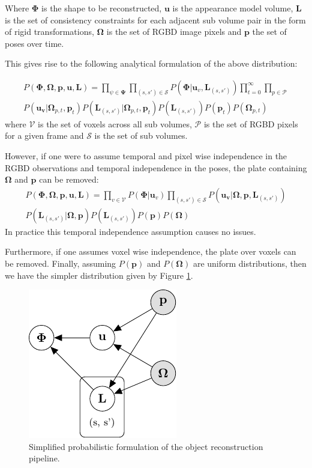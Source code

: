 Where $\bm{\Phi}$ is the shape to be reconstructed, $\bm{u}$ is the appearance model volume, $\bm{L}$ is the 
set of consistency constraints for each adjacent sub volume pair in the form of rigid transformations, $\bm{\Omega}$ is the set of 
RGBD image pixels and $\bm{p}$ the set of poses over time.

This gives rise to the following analytical formulation of the above distribution:

\begin{equation}
\begin{split}
P(\bm{\Phi}, \bm{\Omega}, \bm{p}, \bm{u}, \bm{L}) = 
\prod_{\psi \in \bm{\Psi}}\prod_{(s, s') \in \mathcal{S}}P(\bm{\Phi}|\bm{u}_{v}, \bm{L}_{(s, s')}) 
\prod_{t=0}^{\infty}\prod_{p \in \mathcal{P}}\\
P(\bm{u_{v}}|\bm{\Omega}_{p, t}, \bm{p}_{t})
P(\bm{L}_{(s, s')}|\bm{\Omega}_{p, t}, \bm{p}_{t})
P(\bm{L}_{(s, s')})P(\bm{p}_{t})P(\bm{\Omega}_{p, t})
\end{split}
\end{equation}
where $\mathcal{V}$ is the set of voxels across all sub volumes, $\mathcal{P}$ is the set of RGBD pixels for a given 
frame and $\mathcal{S}$ is the set of sub volumes.

However, if one were to assume temporal and pixel wise independence in the RGBD observations and temporal independence in 
the poses, the plate containing $\bm{\Omega}$ and $\bm{p}$ can be removed:
\begin{equation}
\begin{split}
P(\bm{\Phi}, \bm{\Omega}, \bm{p}, \bm{u}, \bm{L}) = 
\prod_{v \in \mathcal{V}}P(\bm{\Phi}|\bm{u}_{v})
\prod_{(s, s') \in \mathcal{S}}P(\bm{u_{v}}|\bm{\Omega}, \bm{p}, \bm{L}_{(s, s')})\\
P(\bm{L}_{(s, s')}|\bm{\Omega}, \bm{p}) P(\bm{L}_{(s, s')})P(\bm{p})P(\bm{\Omega})
\end{split}
\end{equation}
In practice this temporal independence assumption causes no issues.

Furthermore, if one assumes voxel wise independence, the plate over voxels can be removed. Finally, assuming $P(\bm{p})$ and 
$P(\bm{\Omega})$ are uniform distributions, then we have the simpler distribution given by Figure \ref{pgm2}.
\begin{figure}[h]
	\centering
	\includegraphics{graphical_models/pgm2.pdf}
	\caption{Simplified probabilistic formulation of the object reconstruction pipeline.}
	\label{pgm2}
\end{figure}

